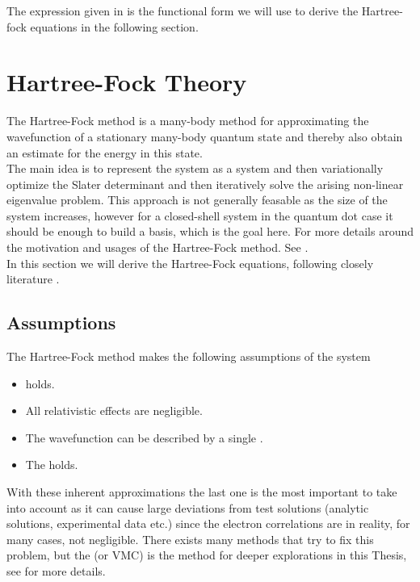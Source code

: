     The expression given in  is the functional form we will
    use to derive the Hartree-fock equations in the following section.

\section{Hartree-Fock Theory\label{sec:HFtheory}}
    The Hartree-Fock method is a many-body method for approximating the
    wavefunction of a stationary many-body quantum state and thereby also
    obtain an estimate for the energy in this state. \\
    The main idea is to represent the system as a  system
    and then variationally optimize the Slater determinant
    \cite{HelgakerMolElcTheory} and then iteratively solve the arising
    non-linear eigenvalue problem. This approach is not generally feasable as
    the size of the system increases, however for a closed-shell system in the
    quantum dot case it should be enough to build a basis, which is the goal
    here.
    For more details around the motivation and usages of the Hartree-Fock
    method. See \cite{HelgakerMolElcTheory}. \\
    
    In this section we will derive the Hartree-Fock equations, following
    closely literature \cite{compphysThijssen}. 

    \subsection{Assumptions}
    The Hartree-Fock method makes the following assumptions of the system
        \begin{itemize}
            \item {} holds. 
            \item All relativistic effects are negligible.
            \item The wavefunction can be described by a single .
            \item The  holds.
        \end{itemize}
    With these inherent approximations the last one is the most important to
    take into account as it can cause large deviations from test solutions
    (analytic solutions, experimental data etc.) since the electron
    correlations are in reality, for many cases, not negligible.  There exists
    many methods that try to fix this problem, but the  (or VMC) is the method for deeper explorations in this Thesis, see
     for more details.
    
